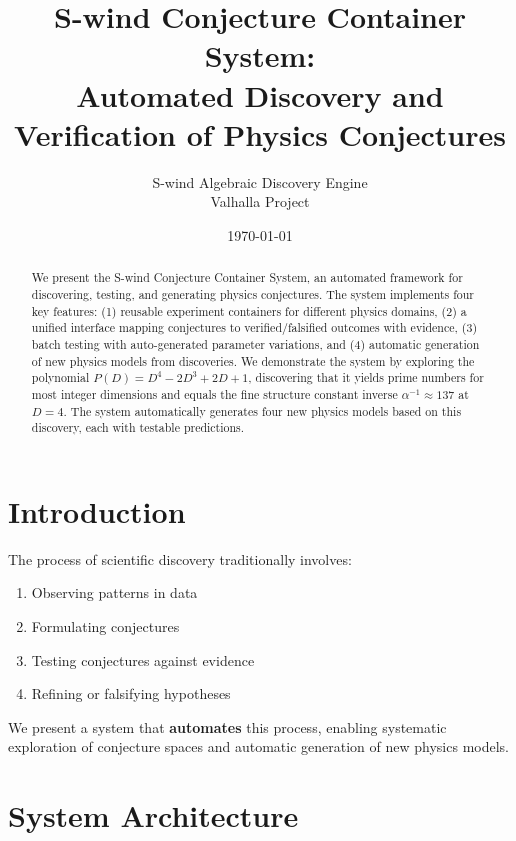 \documentclass[11pt,a4paper]{article}
\title{S-wind Conjecture Container System:\\Automated Discovery and Verification of Physics Conjectures}
\author{S-wind Algebraic Discovery Engine\\Valhalla Project}
\date{\today}
\begin{document}
\maketitle

\begin{abstract}
We present the S-wind Conjecture Container System, an automated framework for discovering, testing, and generating physics conjectures. The system implements four key features: (1) reusable experiment containers for different physics domains, (2) a unified interface mapping conjectures to verified/falsified outcomes with evidence, (3) batch testing with auto-generated parameter variations, and (4) automatic generation of new physics models from discoveries. We demonstrate the system by exploring the polynomial $P(D) = D^4 - 2D^3 + 2D + 1$, discovering that it yields prime numbers for most integer dimensions and equals the fine structure constant inverse $\alpha^{-1} \approx 137$ at $D=4$. The system automatically generates four new physics models based on this discovery, each with testable predictions.
\end{abstract}

\section{Introduction}

The process of scientific discovery traditionally involves:
\begin{enumerate}
    \item Observing patterns in data
    \item Formulating conjectures
    \item Testing conjectures against evidence
    \item Refining or falsifying hypotheses
\end{enumerate}

We present a system that \textbf{automates} this process, enabling systematic exploration of conjecture spaces and automatic generation of new physics models.

\section{System Architecture}
\end{document}
